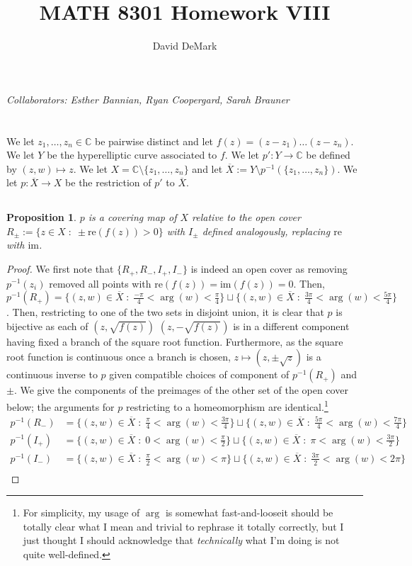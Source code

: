 \documentclass[english]{article}
\title{MATH 8301 Homework VIII}
\author{David DeMark}
\date{\due}
\newcommand{\CC}{\mathbb{C}}
\newcommand{\prob}[1]{\setcounter{section}{#1-1}\section{}}
\newcommand{\prt}[1]{\setcounter{subsection}{#1-1}\subsection{}}
\newtheorem{proposition}[theorem]{Proposition}
\theoremstyle{remark}
\theoremstyle{definition}
\newcommand{\im}{\mathrm{im}}
\newcommand{\re}{\mathrm{re}}
\newcommand{\oX}{\overline{X}}
\begin{document}
	\maketitle
	\emph{Collaborators: Esther Bannian, Ryan Coopergard, Sarah Brauner}
	\prob{1}We let $z_1,\hdots,z_n\in \CC$ be pairwise distinct and let $f(z)=(z-z_1)\hdots(z-z_n)$. We let $Y$ be the hyperelliptic curve associated to $f$. We let $p':Y\to \CC$ be defined by $(z,w)\mapsto z$. We let $X=\CC\setminus \{z_1,\hdots,z_n\}$ and let $\overline{X}:=Y\setminus p^{-1}(\{z_1,\hdots,z_n\})$. We let $p:\overline{X}\to X$ be the restriction of $p'$ to $\oX$.   \prt{1} \begin{proposition}
		$p$ is a covering map of $X$ relative to the open cover $R_\pm:=\{z\in X\;:\; \pm\re({f(z)})>0\}$ with $I_\pm$ defined analogously, replacing $\re$ with $\im$.
	\end{proposition}
\begin{proof}
	We first note that $\{R_+,R_-,I_+,I_-\}$ is indeed an open cover as removing $p^{-1}(z_i)$ removed all points with $\re(f(z))=\im(f(z))=0$. Then, $p^{-1}(R_+)=\{(z,w)\in \oX\;:\; \frac{-\pi}{4}<\arg(w)<\frac{\pi}{4}\}\sqcup \{(z,w)\in \oX\;:\; \frac{3\pi}{4}<\arg(w)<\frac{5\pi}{4}\}$. Then, restricting to one of the two sets in disjoint union, it is clear that $p$ is bijective as each of $(z,\sqrt{f(z)})$ $(z,-\sqrt{f(z)})$ is in a different component having fixed a branch of the square root function. Furthermore, as the square root function is continuous once a branch is chosen, $z\mapsto (z,\pm\sqrt{z})$ is a continuous inverse to $p$ given compatible choices of component of $p^{-1}(R_+)$ and $\pm$. We give the components of the preimages of the other set of the open cover below; the arguments for $p$ restricting to a homeomorphism are identical.\footnote{For simplicity, my usage of $\arg$ is somewhat fast-and-loose\textemdash it should be totally clear what I mean and trivial to rephrase it totally correctly, but I just thought I should acknowledge that \emph{technically} what I'm doing is not quite well-defined. }
	\begin{align*}
		p^{-1}(R_-)&=\{(z,w)\in \oX\;:\; \frac{\pi}{4}<\arg(w)<\frac{3\pi}{4}\}\sqcup \{(z,w)\in \oX\;:\; \frac{5\pi}{4}<\arg(w)<\frac{7\pi}{4}\}\\
		p^{-1}(I_+)&=\{(z,w)\in \oX\;:\; 0<\arg(w)<\frac{\pi}{2}\}\sqcup \{(z,w)\in \oX\;:\; \pi<\arg(w)<\frac{3\pi}{2}\}\\
		p^{-1}(I_-)&=\{(z,w)\in \oX\;:\; \frac{\pi}{2}<\arg(w)<\pi\}\sqcup \{(z,w)\in \oX\;:\; \frac{3\pi}{2}<\arg(w)<2\pi\}\\
	\end{align*}
\end{proof}
\end{document}
